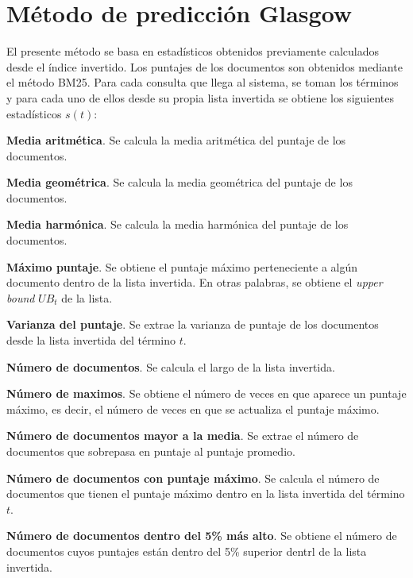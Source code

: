 \section{Método de predicción Glasgow}
\label{scheduling:glasgow}
El presente método \citep{Macdonald:2012} se basa en estadísticos obtenidos previamente calculados desde el índice invertido. Los puntajes de los documentos son obtenidos mediante el método BM25. Para cada consulta que llega al sistema, se toman los términos y para cada uno de ellos desde su propia lista invertida se obtiene los siguientes estadísticos $s(t)$:

\begin{list}{}{}
	\item \textbf{Media aritmética}. Se calcula la media aritmética del puntaje de los documentos.

	\item \textbf{Media geométrica}. Se calcula la media geométrica del puntaje de los documentos.

	\item \textbf{Media harmónica}.  Se calcula la media harmónica del puntaje de los documentos. 

	\item \textbf{Máximo puntaje}. Se obtiene el puntaje máximo perteneciente a algún documento dentro de la lista invertida. En otras palabras, se obtiene el \textit{upper bound} $UB_t$ de la lista. 

	\item \textbf{Varianza del puntaje}. Se extrae la varianza de puntaje de los documentos desde la lista invertida del término $t$. 
	
	\item \textbf{Número de documentos}. Se calcula el largo de la lista invertida. 

	\item \textbf{Número de maximos}. Se obtiene el número de veces en que aparece un puntaje máximo, es decir, el número de veces en que se actualiza el puntaje máximo. 

	\item \textbf{Número de documentos mayor a la media}. Se extrae el número de documentos que sobrepasa en puntaje al puntaje promedio. 
	
	\item \textbf{Número de documentos con puntaje máximo}. Se calcula el número de documentos que tienen el puntaje máximo dentro en la lista invertida del término $t$. 
	
	\item \textbf{Número de documentos dentro del 5\% más alto}. Se obtiene el número de documentos cuyos puntajes están dentro del 5\% superior dentrl de la lista invertida. 
	

\end{list}
